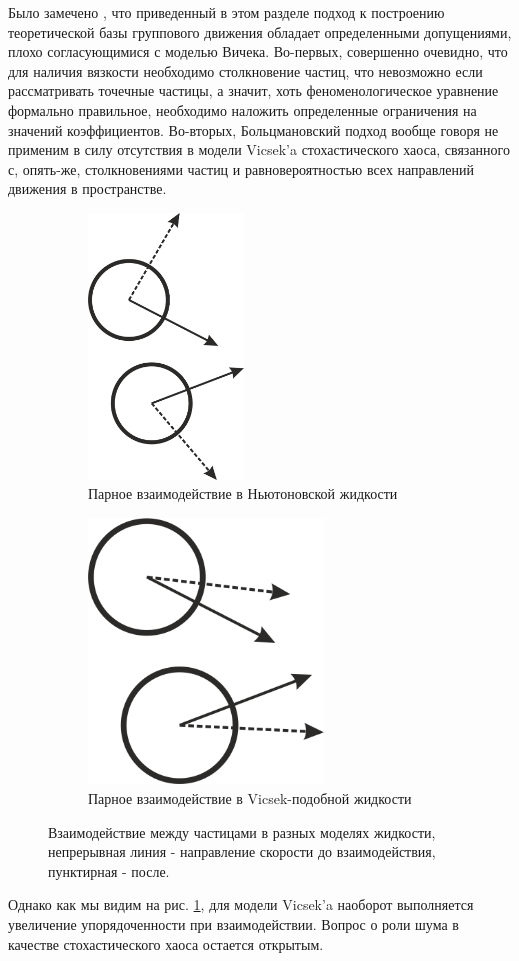 	Было замечено \cite{kulinskii2009,chepizhko2013}, что приведенный в этом разделе подход к построению теоретической базы группового движения обладает определенными допущениями, плохо согласующимися с моделью Вичека. Во-первых, совершенно очевидно, что для наличия вязкости необходимо столкновение частиц, что невозможно если рассматривать точечные частицы, а значит, хоть феноменологическое уравнение формально правильное, необходимо наложить определенные ограничения на значений коэффициентов. Во-вторых, Больцмановский подход вообще говоря не применим в силу отсутствия в модели Vicsek'a стохастического хаоса, связанного с, опять-же, столкновениями частиц и равновероятностью всех направлений движения в пространстве.
	\begin{figure}[h]
	\centering
        \begin{subfigure}{0.45\textwidth}
                \includegraphics[height=200pt]{Images/NewtonInterractions}
                \caption{Парное взаимодействие в Ньютоновской жидкости}
        \end{subfigure}
        \begin{subfigure}{0.45\textwidth}
                \includegraphics[height=200pt]{Images/VicsekInterrcations}
                \caption{Парное взаимодействие в Vicsek-подобной жидкости}
        \end{subfigure}
        \caption{Взаимодействие между частицами в разных моделях жидкости, непрерывная линия - направление скорости до взаимодействия, пунктирная - после.}
        \label{fig:PairParticleInterractions}
	\end{figure}

	Однако как мы видим на рис. \ref{fig:PairParticleInterractions}, для модели Vicsek'a наоборот выполняется увеличение упорядоченности при взаимодействии. Вопрос о роли шума в качестве стохастического хаоса остается открытым.
